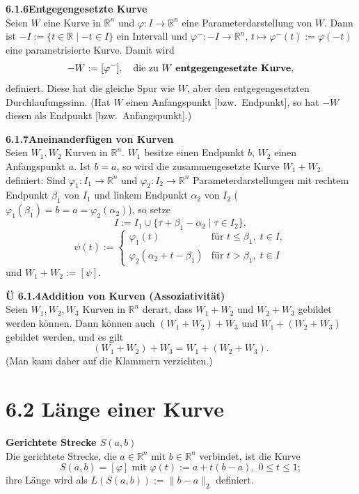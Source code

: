 \documentclass[a4paper,12pt]{article}
\newcommand{\gentry}[3]{%
  \noindent\textbf{#1\quad #2}\nopagebreak\\[0.2em]
  #3\par\smallskip
}
\begin{document}
\gentry{6.1.6}{Entgegengesetzte Kurve}{%
  Seien $W$ eine Kurve in $\mathbb{R}^n$ und $\varphi : I \longrightarrow \mathbb{R}^n$ eine
  Parameterdarstellung von $W$. Dann ist $-I := \{t \in \mathbb{R} \mid -t \in I\}$ ein
  Intervall und $\varphi^- : -I \longrightarrow \mathbb{R}^n$, $t \mapsto \varphi^-(t) := \varphi(-t)$
  eine parametrisierte Kurve. Damit wird
  \[
    -W := [\varphi^-], \quad \text{die zu } W \text{ \textbf{entgegengesetzte Kurve}},
  \]
  definiert. Diese hat die gleiche Spur wie $W$, aber den entgegengesetzten
  Durchlaufungssinn. (Hat $W$ einen Anfangspunkt [bzw.\ Endpunkt], so hat $-W$ diesen
  als Endpunkt [bzw.\ Anfangspunkt].)
}

\gentry{6.1.7}{Aneinanderfügen von Kurven}{%
  Seien $W_1, W_2$ Kurven in $\mathbb{R}^n$. $W_1$ besitze einen Endpunkt $b$,
  $W_2$ einen Anfangspunkt $a$. Ist $b = a$, so wird die zusammengesetzte Kurve
  $W_1 + W_2$ definiert: Sind $\varphi_1 : I_1 \longrightarrow \mathbb{R}^n$ und
  $\varphi_2 : I_2 \longrightarrow \mathbb{R}^n$ Parameterdarstellungen mit rechtem
  Endpunkt $\beta_1$ von $I_1$ und linkem Endpunkt $\alpha_2$ von $I_2$
  ($\varphi_1(\beta_1) = b = a = \varphi_2(\alpha_2)$), so setze
  \[
    I := I_1 \cup \{\tau + \beta_1 - \alpha_2 \mid \tau \in I_2\},
  \]
  \[
    \psi(t) := \begin{cases} \varphi_1(t) & \text{für } t \leq \beta_1,\; t \in I,\\
                             \varphi_2(\alpha_2 + t - \beta_1) & \text{für } t > \beta_1,\; t \in I\end{cases}
  \]
  und $W_1 + W_2 := [\psi]$.
}

\gentry{Ü 6.1.4}{Addition von Kurven (Assoziativität)}{%
  Seien $W_1, W_2, W_3$ Kurven in $\mathbb{R}^n$ derart, dass $W_1 + W_2$ und $W_2 + W_3$
  gebildet werden können. Dann können auch $(W_1 + W_2) + W_3$ und $W_1 + (W_2 + W_3)$
  gebildet werden, und es gilt
  \[
    (W_1 + W_2) + W_3 = W_1 + (W_2 + W_3).
  \]
  (Man kann daher auf die Klammern verzichten.)
}

\section*{6.2 \quad Länge einer Kurve}

\gentry{}{Gerichtete Strecke $S(a,b)$}{%
  Die gerichtete Strecke, die $a \in \mathbb{R}^n$ mit $b \in \mathbb{R}^n$ verbindet,
  ist die Kurve
  \[
    S(a,b) = [\varphi] \text{ mit } \varphi(t) := a + t(b-a),\; 0 \leq t \leq 1;
  \]
  ihre Länge wird als $L(S(a,b)) := \|b - a\|_2$ definiert.
}
\end{document}
